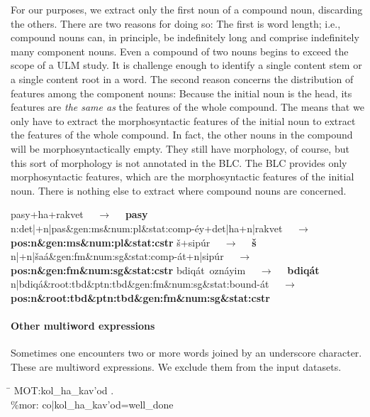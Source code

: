 For our purposes, we extract only the first noun of a compound noun, 
discarding the others. 
There are two reasons for doing so:
The first is word length; 
i.e., compound nouns can, in principle, be indefinitely long and comprise
indefinitely many component nouns.
Even a compound of two nouns begins to exceed the scope 
of a ULM study. It is challenge enough 
to identify a single 
content stem or a single content root in a word. 
The second reason concerns the distribution of features among the 
component nouns: Because the initial noun is the head, its 
features are \emph{the same as} the features of the whole compound. 
The means that we only have to extract the morphosyntactic 
features of the initial noun to extract the features of the whole 
compound. In fact, the other nouns in the compound will be 
morphosyntactically empty. They still have morphology, of course, 
but this sort of morphology is not annotated in 
the BLC. The BLC provides only morphosyntactic 
features, which are the morphosyntactic features of the initial 
noun. There is nothing else to extract where compound nouns 
are concerned.

\begin{exe}
\ex \label{ex:cstr:pasey2}
	\textsf{pasy+ha+rakvet} $\quad\to\quad$ 
	\textbf{\textsf{pasy}} \\
	\textsf{n:det|+n|pas\&gen:ms\&num:pl\&stat:comp-\'{e}y+det|ha+n|rakvet} $\quad\to\quad$ \\
	\textbf{\textsf{pos:n\&gen:ms\&num:pl\&stat:cstr}}
\ex \label{ex:cstr:shaat2} 
	\textsf{\v{s}+sip\'{u}r} $\quad\to\quad$ \textbf{\textsf{\v{s}}}\\
	\textsf{n|+n|\v{s}a\'a\&gen:fm\&num:sg\&stat:comp-\'at+n|sip\'ur} $\quad\to\quad$ \\
	\textbf{\textsf{pos:n\&gen:fm\&num:sg\&stat:cstr}}
\ex \label{ex:cstr:bdiqat2} 
	\textsf{bdiq\'{a}t\, ozn\'{a}yim} $\quad\to\quad$ \textbf{\textsf{\textsf{bdiq\'{a}t}}} \\ 
	\textsf{n|bdiq\'{a}\&root:tbd\&ptn:tbd\&gen:fm\&num:sg\&stat:bound-\'{a}t} $\quad\to\quad$ \\
	\textbf{\textsf{pos:n\&root:tbd\&ptn:tbd\&gen:fm\&num:sg\&stat:cstr}}
\end{exe}

\paragraph{Other multiword expressions} Sometimes one encounters two or more words joined 
by an underscore character. These are multiword expressions. We exclude them from
the input datasets. 
\begin{exe}
\ex \begin{tabbing}
\hspace{0.6in} \= \hspace{5.5in} \kill
\textsf{\*MOT:}\>\textsf{kol\_ha\_kav\a'{o}d .} \\
\textsf{\%mor:} \> \textsf{co|kol\_ha\_kav\a'{o}d=well\_done}
\end{tabbing}
\end{exe}


